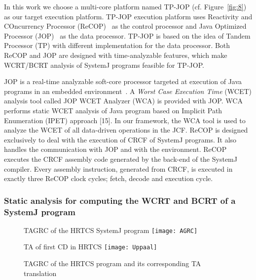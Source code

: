 In this work we choose a multi-core platform named TP-JOP (cf.
Figure~\ref{fig:8}) as our target execution platform. TP-JOP execution
platform uses Reactivity and COncurrency Processor
(ReCOP)~\cite{DBLP:journals/tecs/SalcicM13} as the control processor and
Java Optimized Processor (JOP)~\cite{jop:jnl:jsa2007} as the data
processor. TP-JOP is based on the idea of Tandem Processor (TP)
\cite{DBLP:journals/tecs/SalcicM13} with different implementation for
the data processor. Both ReCOP and JOP are designed with time-analyzable
features, which make WCRT/BCRT analysis of SystemJ programs feasible for
TP-JOP. %

JOP is a real-time analyzable soft-core processor targeted at execution
of Java programs in an embedded environment~\cite{jop:jnl:jsa2007}. A
\textit{Worst Case Execution Time} (WCET) analysis tool called JOP WCET
Analyzer (W\-CA) is provided with JOP. WCA performs static WCET analysis
of Java program based on Implicit Path Enumeration (IPET) approach
[15]. In our framework, the WCA tool is used to analyze the WCET of all
data-driven operations in the JCF. ReCOP is designed exclusively to deal
with the execution of CRCF of SystemJ programs. It also handles the
communication with JOP and with the environment. ReCOP executes the CRCF
assembly code generated by the back-end of the SystemJ compiler. Every
assembly instruction, generated from CRCF, is executed in exactly three
ReCOP clock cycles; fetch, decode and execution cycle.

\subsubsection{Static analysis for computing the WCRT and BCRT of a
  SystemJ program}
\label{sec:stat-analys-comp-1}

\begin{figure*}[t!]
  \centering
  \begin{SubFloat}{\label{fig:6a} TAGRC of the HRTCS SystemJ program}
    \texttt{[image: AGRC]}
  \end{SubFloat}%
  \begin{SubFloat}{\label{fig:6b} TA of first CD in HRTCS}
    \texttt{[image: Uppaal]}
  \end{SubFloat}
  \caption{TAGRC of the HRTCS program and its corresponding TA
    translation}
  \label{fig:6}
\end{figure*}


